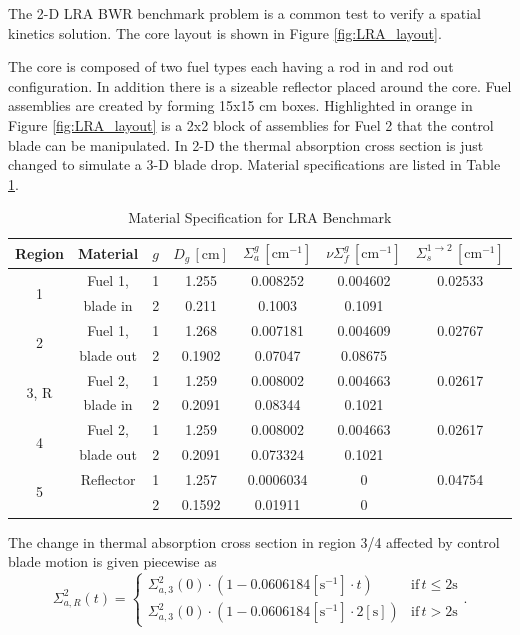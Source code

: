 \documentclass{ansconf}
\numberwithin{equation}{section}
\begin{document}
The 2-D LRA BWR benchmark problem is a common test to verify a spatial kinetics solution. The core layout is shown in Figure \ref{fig:LRA_layout}.

The core is composed of two fuel types each having a rod in and rod out configuration. In addition there is a sizeable reflector placed around the core. Fuel assemblies are created by forming 15x15 cm boxes. Highlighted in orange in Figure \ref{fig:LRA_layout} is a 2x2 block of assemblies for Fuel 2 that the control blade can be manipulated. In 2-D the thermal absorption cross section is just changed to simulate a 3-D blade drop. Material specifications are listed in Table \ref{tab:LRA_mats}.
\begin{table}
\centering
\caption{Material Specification for LRA Benchmark}
\label{tab:LRA_mats}
\begin{tabular}{ccccccc}
\toprule 
Region & Material & $g$ & $D_{g}\,\left[\mathrm{cm}\right]$ & $\Sigma_{a}^{g}\,\left[\mathrm{cm}^{-1}\right]$ & $\nu\Sigma_{f}^{g}\,\left[\mathrm{cm}^{-1}\right]$ & $\Sigma_{s}^{1\rightarrow2}\,\left[\mathrm{cm}^{-1}\right]$\tabularnewline
\midrule
\midrule 
\multirow{2}{*}{1} & Fuel 1, & 1 & 1.255 & 0.008252 & 0.004602 & 0.02533\tabularnewline
\cmidrule{2-7} 
 & blade in & 2 & 0.211 & 0.1003 & 0.1091 & \tabularnewline
\midrule 
\multirow{2}{*}{2} & Fuel 1, & 1 & 1.268 & 0.007181 & 0.004609 & 0.02767\tabularnewline
\cmidrule{2-7} 
 & blade out & 2 & 0.1902 & 0.07047 & 0.08675 & \tabularnewline
\midrule 
\multirow{2}{*}{3, R} & Fuel 2, & 1 & 1.259 & 0.008002 & 0.004663 & 0.02617\tabularnewline
\cmidrule{2-7} 
 & blade in & 2 & 0.2091 & 0.08344 & 0.1021 & \tabularnewline
\midrule 
\multirow{2}{*}{4} & Fuel 2, & 1 & 1.259 & 0.008002 & 0.004663 & 0.02617\tabularnewline
\cmidrule{2-7} 
 & blade out & 2 & 0.2091 & 0.073324 & 0.1021 & \tabularnewline
\midrule 
\multirow{2}{*}{5} & Reflector & 1 & 1.257 & 0.0006034 & 0 & 0.04754\tabularnewline
\cmidrule{2-7} 
 &  & 2 & 0.1592 & 0.01911 & 0 & \tabularnewline
\bottomrule
\end{tabular} 
\end{table}
The change in thermal absorption cross section in region 3/4 affected by control blade motion is given piecewise as
\begin{equation}\label{eq:LRA_xsrod}
    \Sigma_{a,R}^2\left(t\right) = \left\lbrace \begin{array}{cc} \Sigma_{a,3}^2\left(0\right)\cdot\left(1 -0.0606184\left[\mathrm{s}^{-1}\right]\cdot t \right) & \mathrm{if}\,t\le 2\mathrm{s} \\
    \Sigma_{a,3}^2\left(0\right)\cdot\left(1 -0.0606184\left[\mathrm{s}^{-1}\right]\cdot 2\left[\mathrm{s}\right] \right) & \mathrm{if}\,t > 2\mathrm{s} \end{array}\right. .
\end{equation}
\end{document}
